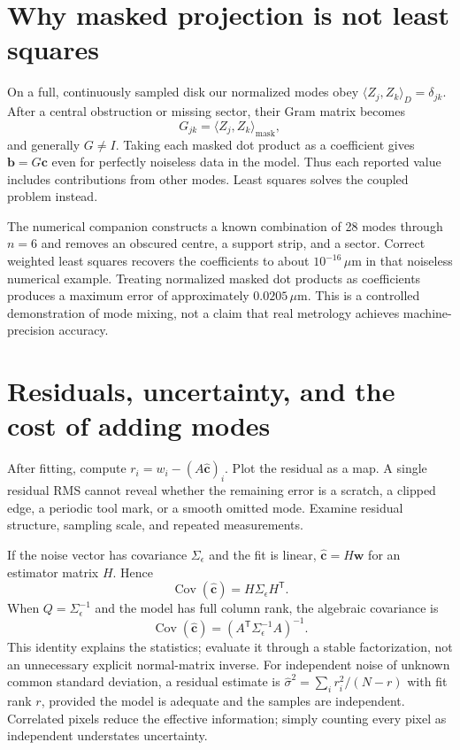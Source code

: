 \section{Why masked projection is not least squares}
On a full, continuously sampled disk our normalized modes obey
$\langle Z_j,Z_k\rangle_D=\delta_{jk}$. After a central obstruction
or missing sector, their Gram matrix becomes
\begin{equation}
 G_{jk}=\langle Z_j,Z_k\rangle_{\mathrm{mask}},
\end{equation}
and generally $G\ne I$. Taking each masked dot product as a coefficient
gives $\bm b=G\bm c$ even for perfectly noiseless data in the model.
Thus each reported value includes contributions from other modes.
Least squares solves the coupled problem instead.

The numerical companion constructs a known combination of 28 modes
through $n=6$ and removes an obscured centre, a support strip, and a
sector. Correct weighted least squares recovers the coefficients to
about $10^{-16}\,\mu\mathrm m$ in that noiseless numerical example.
Treating normalized masked dot products as coefficients produces a
maximum error of approximately $0.0205\,\mu\mathrm m$.
This is a controlled demonstration of mode mixing, not a claim that
real metrology achieves machine-precision accuracy.

\section{Residuals, uncertainty, and the cost of adding modes}
After fitting, compute $r_i=w_i-(A\widehat{\bm c})_i$. Plot the
residual as a map. A single residual RMS cannot reveal whether the
remaining error is a scratch, a clipped edge, a periodic tool mark,
or a smooth omitted mode. Examine residual structure, sampling scale,
and repeated measurements.

If the noise vector has covariance $\Sigma_\epsilon$ and the fit is
linear, $\widehat{\bm c}=H\bm w$ for an estimator matrix $H$. Hence
\begin{equation}
 \operatorname{Cov}(\widehat{\bm c})=H\Sigma_\epsilon H^{\mathsf T}.
\end{equation}
When $Q=\Sigma_\epsilon^{-1}$ and the model has full column rank,
the algebraic covariance is
\begin{equation}
 \operatorname{Cov}(\widehat{\bm c})=(A^{\mathsf T}
             \Sigma_\epsilon^{-1}A)^{-1}.
\end{equation}
This identity explains the statistics; evaluate it through a stable
factorization, not an unnecessary explicit normal-matrix inverse.
For independent noise of unknown common standard deviation, a
residual estimate is $\widehat\sigma^2=\sum_i r_i^2/(N-r)$ with
fit rank $r$, provided the model is adequate and the samples are
independent. Correlated pixels reduce the effective information; simply
counting every pixel as independent understates uncertainty.

